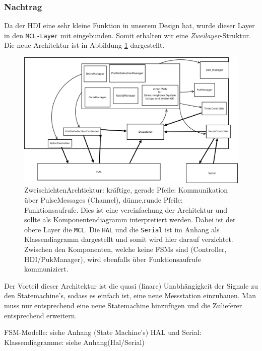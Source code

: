 \documentclass[
   draft=false
  ,paper=a4
  ,twoside=true
  ,fontsize=11pt
  ,headsepline
  ,DIV11
  ,parskip=full+
]{scrartcl} %
\begin{document}
\subsubsection{Nachtrag}
Da der HDI eine sehr kleine Funktion in unserem Design hat, wurde dieser Layer in den \texttt{MCL-Layer} mit eingebunden. 
Somit erhalten wir eine \emph{Zweilayer}-Struktur.
Die neue Architektur ist in Abbildung \ref{fig:newArch} dargestellt.

\begin{figure}[htp]
  	\centering
    \includegraphics[width=\textwidth]{./IMG/newArch.png}
    \caption[neue Zweischichten Arch]{ZweischichtenArchtiektur: kräftige, gerade Pfeile: Kommunikation über PulseMessages (Channel), dünne,runde Pfeile: Funktionsaufrufe. Dies ist eine vereinfachung der Architektur und sollte als Komponentendiagramm interpretiert werden. Dabei ist der obere Layer die \texttt{MCL}. Die \texttt{HAL} und die \texttt{Serial} ist im Anhang als Klassendiagramm dargestellt und somit wird hier darauf verzichtet. Zwischen den Komponenten, welche keine FSMs sind (Controller, HDI/PukManager), wird ebenfalls über Funktionsaufrufe kommuniziert. }
     \label{fig:newArch}
\end{figure}

Der Vorteil dieser Architektur ist die quasi (linare) Unabhängigkeit der Signale zu den Statemachine's, sodass es einfach ist, eine neue Messstation einzubauen.
Man muss nur entsprechend eine neue Statemachine  hinzufügen und die Zulieferer entsprechend erweitern.

FSM-Modelle: siehe Anhang (State Machine's)
HAL und Serial: Klassendiagramme: siehe Anhang(Hal/Serial)
\end{document}
